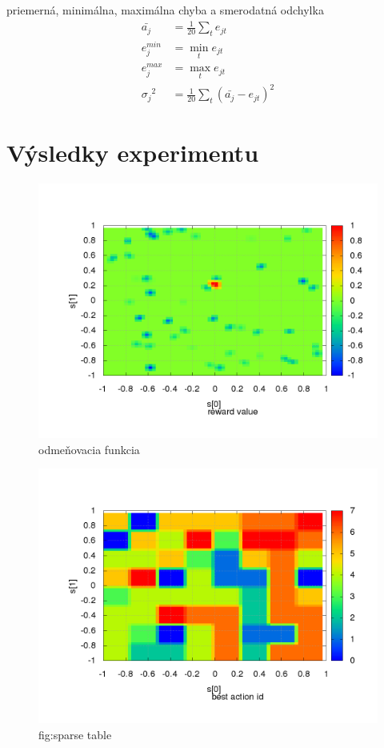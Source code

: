 priemerná, minimálna, maximálna chyba a smerodatná odchylka \\
\begin{align}
\bar{a_j} &= \frac{1}{20}\sum\limits_{t}{e_{jt}}  \nonumber \\
{e^{min}_j} &= \min_{t}{e_{jt}}  \nonumber \\
{e^{max}_j} &= \max_{t}{e_{jt}}  \nonumber \\
{\sigma_j}^2 &= \frac{1}{20}\sum\limits_{t}{(\bar{a_j} - e_{jt})^2}  \nonumber
\end{align}

\section {Výsledky experimentu}



\begin{figure}[!htb]
\centering
\includegraphics[scale=.4]{../../results_q_learning/map_1/reward_value_surface.png}
\caption{odmeňovacia funkcia}
\end{figure}



\begin{figure}[!htb]
\centering
\includegraphics[scale=.4]{../../results_q_learning/map_1/function_type_1/iterations_10/action_best_value_log_surface.png}
\caption{fig:sparse table}
\end{figure}

